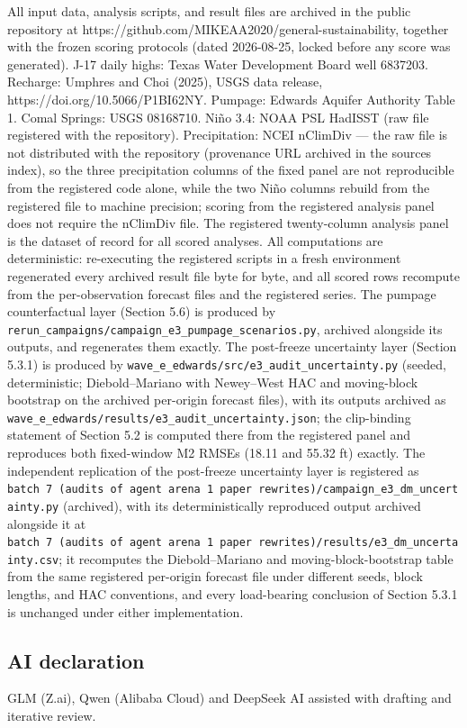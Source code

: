 \documentclass[11pt]{article}
\begin{document}
All input data, analysis scripts, and result files are archived in the
public repository at
https://github.com/MIKEAA2020/general-sustainability, together with the
frozen scoring protocols (dated 2026-08-25, locked before any score was
generated). J-17 daily highs: Texas Water Development Board well
6837203. Recharge: Umphres and Choi (2025), USGS data release,
https://doi.org/10.5066/P1BI62NY. Pumpage: Edwards Aquifer Authority
Table 1. Comal Springs: USGS 08168710. Ni\~no 3.4: NOAA PSL HadISST (raw
file registered with the repository). Precipitation: NCEI nClimDiv ---
the raw file is not distributed with the repository (provenance URL
archived in the sources index), so the three precipitation columns of
the fixed panel are not reproducible from the registered code alone,
while the two Ni\~no columns rebuild from the registered file to machine
precision; scoring from the registered analysis panel does not require
the nClimDiv file. The registered twenty-column analysis panel is the
dataset of record for all scored analyses. All computations are
deterministic: re-executing the registered scripts in a fresh
environment regenerated every archived result file byte for byte, and
all scored rows recompute from the per-observation forecast files and
the registered series. The pumpage counterfactual layer (Section 5.6) is
produced by
\texttt{rerun\_campaigns/campaign\_e3\_pumpage\_scenarios.py}, archived
alongside its outputs, and regenerates them exactly. The post-freeze
uncertainty layer (Section 5.3.1) is produced by
\texttt{wave\_e\_edwards/src/e3\_audit\_uncertainty.py} (seeded,
deterministic; Diebold--Mariano with Newey--West HAC and moving-block
bootstrap on the archived per-origin forecast files), with its outputs
archived as
\texttt{wave\_e\_edwards/results/e3\_audit\_uncertainty.json}; the
clip-binding statement of Section 5.2 is computed there from the
registered panel and reproduces both fixed-window M2 RMSEs (18.11 and
55.32 ft) exactly. The independent replication of the post-freeze
uncertainty layer is registered as
\texttt{batch\ 7\ (audits\ of\ agent\ arena\ 1\ paper\ rewrites)/campaign\_e3\_dm\_uncertainty.py}
(archived), with its deterministically reproduced output archived
alongside it at
\texttt{batch\ 7\ (audits\ of\ agent\ arena\ 1\ paper\ rewrites)/results/e3\_dm\_uncertainty.csv};
it recomputes the Diebold--Mariano and moving-block-bootstrap table from
the same registered per-origin forecast file under different seeds,
block lengths, and HAC conventions, and every load-bearing conclusion of
Section 5.3.1 is unchanged under either implementation.

\subsection*{AI declaration}
GLM (Z.ai), Qwen (Alibaba Cloud) and DeepSeek AI assisted with drafting and iterative review.
\end{document}
